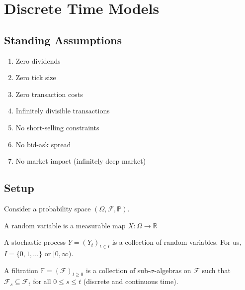 \chapter{Discrete Time Models}
\label{cha:discrete-time-models}

\section{Standing Assumptions}
\label{sec:standing-assumptions}

\begin{enumerate}
\item Zero dividends
\item Zero tick size
\item Zero transaction costs
\item Infinitely divisible transactions
\item No short-selling constraints
\item No bid-ask spread
\item No market impact (infinitely deep market)
\end{enumerate}

\section{Setup}
\label{sec:setup}

Consider a probability space $(\Omega, \mathcal{F}, \mathbb{P})$.

\begin{defn}
  \label{defn:1}
  A random variable is a measurable map $X: \Omega \rightarrow \mathbb{R}$
\end{defn}

\begin{defn}
  \label{defn:2}
  A stochastic process $Y = (Y_{t})_{t \in I}$ is a collection of
  random variables.  For us, $I = \{ 0, 1, \dots \}$ or $[0, \infty)$. 
\end{defn}


\begin{defn}
  \label{defn:3}
  A filtration $\mathbb{F} = (\mathcal{F})_{t \geq 0}$ is a collection
  of sub-$\sigma$-algebras on $\mathcal{F}$ such that $\mathcal{F}_{s}
  \subseteq \mathcal{F}_{t}$ for all $0 \leq s \leq t$ (discrete and
  continuous time).
\end{defn}

